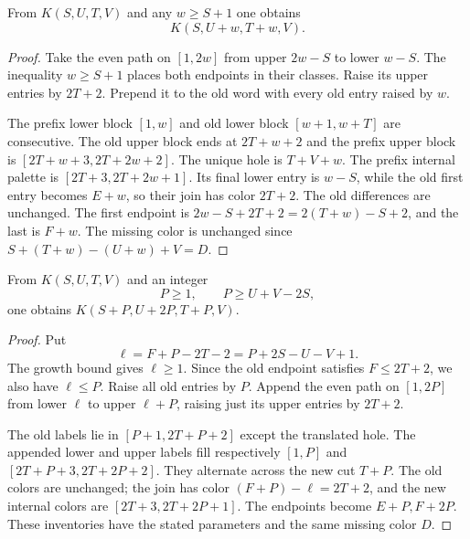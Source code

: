 \begin{lemma}\label{ok:carrier-prefix}
From $K(S,U,T,V)$ and any $w\ge S+1$ one obtains
\[
 K(S,U+w,T+w,V).
\]
\end{lemma}
\begin{proof}
Take the even path on $[1,2w]$ from upper $2w-S$ to lower $w-S$.
The inequality $w\ge S+1$ places both endpoints in their classes.
Raise its upper entries by $2T+2$. Prepend it to the old word with
every old entry raised by $w$.

The prefix lower block $[1,w]$ and old lower block $[w+1,w+T]$
are consecutive. The old upper block ends at $2T+w+2$ and the
prefix upper block is $[2T+w+3,2T+2w+2]$. The unique hole is
$T+V+w$. The prefix internal palette is
$[2T+3,2T+2w+1]$. Its final lower entry is $w-S$, while the old
first entry becomes $E+w$, so their join has color $2T+2$.
The old differences are unchanged. The first endpoint is
$2w-S+2T+2=2(T+w)-S+2$, and the last is $F+w$.
The missing color is unchanged since
$S+(T+w)-(U+w)+V=D$.
\end{proof}

\begin{lemma}\label{ok:asymmetric-growth}
From $K(S,U,T,V)$ and an integer
\[
 P\ge1,\qquad P\ge U+V-2S,
 \]
one obtains $K(S+P,U+2P,T+P,V)$.
\end{lemma}
\begin{proof}
Put
\[
 \ell=F+P-2T-2=P+2S-U-V+1.
 \]
The growth bound gives $\ell\ge1$. Since the old endpoint satisfies
$F\le2T+2$, we also have $\ell\le P$. Raise all old entries by $P$.
Append the even path on $[1,2P]$ from lower $\ell$ to upper
$\ell+P$, raising just its upper entries by $2T+2$.

The old labels lie in $[P+1,2T+P+2]$ except the translated hole.
The appended lower and upper labels fill respectively $[1,P]$ and
$[2T+P+3,2T+2P+2]$. They alternate across the new cut $T+P$.
The old colors are unchanged; the join has color
$(F+P)-\ell=2T+2$, and the new internal colors are
$[2T+3,2T+2P+1]$. The endpoints become $E+P,F+2P$.
These inventories have the stated parameters and the same missing
color $D$.
\end{proof}

